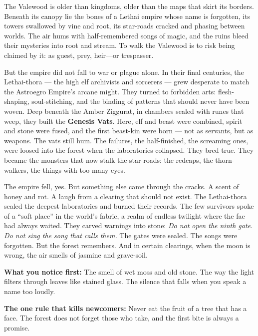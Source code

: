 \documentclass[12pt,oneside]{book}
\begin{document}
\begin{tcolorbox}[colback=black!3,colframe=blue!60!black,title={Theme \& Atmosphere},breakable]
The Valewood is older than kingdoms, older than the maps that skirt its borders. Beneath its canopy lie the bones of a Lethai empire whose name is forgotten, its towers swallowed by vine and root, its star-roads cracked and phasing between worlds. The air hums with half-remembered songs of magic, and the ruins bleed their mysteries into root and stream. To walk the Valewood is to risk being claimed by it: as guest, prey, heir---or trespasser.

But the empire did not fall to war or plague alone. In their final centuries, the Lethai-thora --- the high elf archivists and sorcerers --- grew desperate to match the Astroegro Empire's arcane might. They turned to forbidden arts: flesh-shaping, soul-stitching, and the binding of patterns that should never have been woven. Deep beneath the Amber Ziggurat, in chambers sealed with runes that weep, they built the \textbf{Genesis Vats}. Here, elf and beast were combined, spirit and stone were fused, and the first beast-kin were born --- not as servants, but as weapons. The vats still hum. The failures, the half-finished, the screaming ones, were loosed into the forest when the laboratories collapsed. They bred true. They became the monsters that now stalk the star-roads: the redcaps, the thorn-walkers, the things with too many eyes.

The empire fell, yes. But something else came through the cracks. A scent of honey and rot. A laugh from a clearing that should not exist. The Lethai-thora sealed the deepest laboratories and burned their records. The few survivors spoke of a ``soft place'' in the world's fabric, a realm of endless twilight where the fae had always waited. They carved warnings into stone: \textit{Do not open the ninth gate. Do not sing the song that calls them.} The gates were sealed. The songs were forgotten. But the forest remembers. And in certain clearings, when the moon is wrong, the air smells of jasmine and grave-soil.

\vspace{2mm}
\textbf{What you notice first:} The smell of wet moss and old stone. The way the light filters through leaves like stained glass. The silence that falls when you speak a name too loudly.

\textbf{The one rule that kills newcomers:} Never eat the fruit of a tree that has a face. The forest does not forget those who take, and the first bite is always a promise.
\end{tcolorbox}
\end{document}
